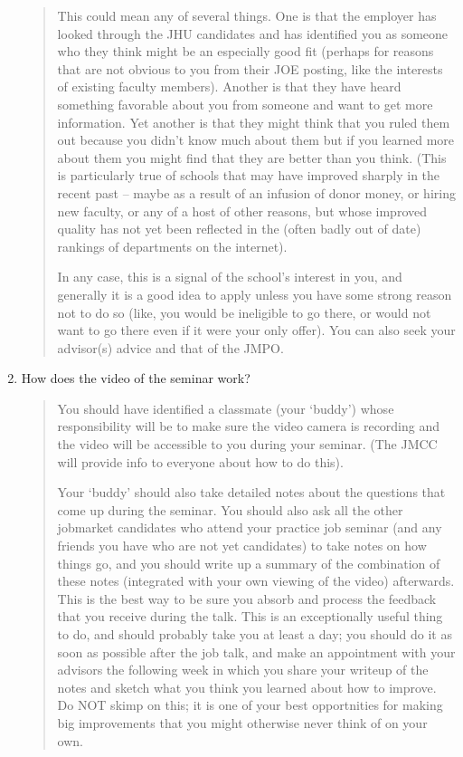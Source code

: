 \documentclass{\classes/econtex}
\begin{document}
\begin{enumerate}
  \begin{quote}
    This could mean any of several things.  One is that the employer has looked through the JHU candidates and has identified you as someone who they think might be an especially good fit (perhaps for reasons that are not obvious to you from their JOE posting, like the interests of existing faculty members).  Another is that they have heard something favorable about you from someone and want to get more information.  Yet another is that they might think that you ruled them out because you didn't know much about them but if you learned more about them you might find that they are better than you think.  (This is particularly true of schools that may have improved sharply in the recent past -- maybe as a result of an infusion of donor money, or hiring new faculty, or any of a host of other reasons, but whose improved quality has not yet been reflected in the (often badly out of date) rankings of departments on the internet).

    In any case, this is a signal of the school's interest in you, and generally it is a good idea to apply unless you have some strong reason not to do so (like, you would be ineligible to go there, or would not want to go there even if it were your only offer).  You can also seek your advisor(s) advice and that of the JMPO.


  \end{quote}
\item  How does the video of the seminar work?
  
  \begin{quote}
    You should have identified a classmate (your `buddy') whose
    responsibility will be to make sure the video camera is recording
    and the video will be accessible to you during your seminar.  (The
    JMCC will provide info to everyone about how to do this).  

    Your `buddy' should also take detailed notes about the questions
    that come up during the seminar.  You should also ask all the other
    jobmarket candidates who attend your practice job seminar (and any
    friends you have who are not yet candidates) to take notes on how
    things go, and you should write up a summary of the combination of
    these notes (integrated with your own viewing of the video)
    afterwards.  This is the best way to be sure you absorb and process
    the feedback that you receive during the talk.  This is an
    exceptionally useful thing to do, and should probably take you at least
    a day; you should do it as soon as possible after the job talk, and
    make an appointment with your advisors the following week in which
    you share your writeup of the notes and sketch what you think you
    learned about how to improve.  Do NOT skimp on this; it is one of
    your best opportnities for making big improvements that you might
    otherwise never think of on your own.


\end{quote}
\end{enumerate}
\end{document}
